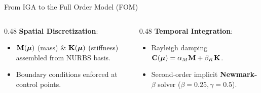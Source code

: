 \begin{frame}{From IGA to the Full Order Model (FOM)}
  \vspace{0.15cm}

  \begin{columns}[T]
    \begin{column}{0.48\textwidth}
      \small\textbf{Spatial Discretization}:
      \begin{itemize}
        \footnotesize
        \setlength{\itemsep}{0.08cm}
        \item $\mathbf{M}(\boldsymbol{\mu})$ (mass) \& $\mathbf{K}(\boldsymbol{\mu})$ (stiffness) assembled from NURBS basis.
        \item Boundary conditions enforced at control points.
      \end{itemize}
    \end{column}
    \begin{column}{0.48\textwidth}
      \small\textbf{Temporal Integration}:
      \begin{itemize}
        \footnotesize
        \setlength{\itemsep}{0.08cm}
        \item Rayleigh damping $\mathbf{C}(\boldsymbol{\mu}) = \alpha_M\mathbf{M} + \beta_K\mathbf{K}$.
        \item Second-order implicit \textbf{Newmark-$\beta$} solver ($\beta=0.25, \gamma=0.5$).
      \end{itemize}
    \end{column}
  \end{columns}
\end{frame}

